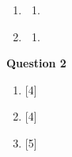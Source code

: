 \begin{enumerate}[label=(\roman*)]
        \begin{multicols}{2}
        \begin{enumerate}[label=(\alph*)]
            \item 
        \end{enumerate}
        \end{multicols}

    \item 

        \begin{multicols}{2}
        \begin{enumerate}[label=(\alph*)]
            \item 
        \end{enumerate}
        \end{multicols}

    \item 

        \begin{multicols}{2}
        \begin{enumerate}[label=(\alph*)]
            \item 
        \end{enumerate}
        \end{multicols}

\end{enumerate}

\par
\noindent
\textbf{Question 2}\\
\begin{enumerate}[label=(\roman*)]

    \item \hfill [4]

    \item \hfill [4]

    \item \hfill [5]

\end{enumerate}
